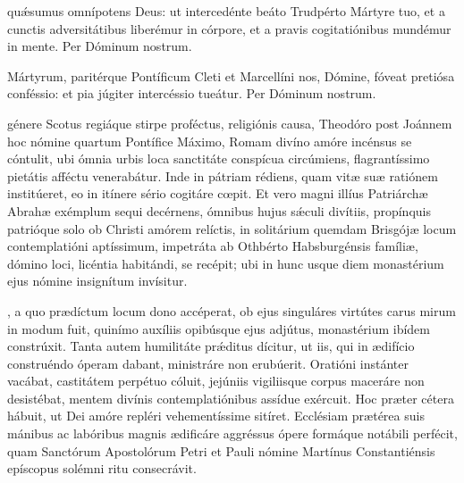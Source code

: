 \documentclass[fontsize=9pt,paper=A6,twoside,BCOR=1mm,DIV=22,headinclude]{scrarticle}
\begin{document}
\begin{multicols}{2}




\AiMTP

\VRMTPi 

 qu\'æsumus omnípotens Deus: ut intercedénte beáto Trudpérto Mártyre tuo, et a cunctis adversitátibus liberémur in córpore, et a pravis cogitatiónibus mundémur in mente. Per Dóminum nostrum.


\AiiMTP

\VRMTPii

 Mártyrum, paritérque Pontíficum Cleti et Marcellíni nos, Dómine, fóveat pretiósa conféssio: et pia júgiter intercéssio tueátur. Per Dóminum nostrum.

 génere Scotus regiáque stirpe proféctus, religiónis causa, Theodóro post Joánnem hoc nómine quartum Pontífice Máximo, Romam divíno amóre incénsus se cóntulit, ubi ómnia urbis loca sanctitáte conspícua circúmiens, flagrantíssimo pietátis afféctu venerabátur. Inde in pátriam rédiens, quam vitæ suæ ratiónem institúeret, eo in itínere sério cogitáre cœpit. Et vero magni illíus Patriárchæ Abrahæ exémplum sequi decérnens, ómnibus hujus s\'æculi divítiis, propínquis patrióque solo ob Christi amórem relíctis, in solitárium quemdam Brisgójæ locum contemplatióni aptíssimum, impetráta ab Othbérto Habsburgénsis famíliæ, dómino loci, licéntia habitándi, se recépit; ubi in hunc usque diem monastérium ejus nómine insignítum invísitur.

\RVMTPiv

, a quo prædíctum locum dono accéperat, ob ejus singuláres virtútes carus mirum in modum fuit, quinímo auxíliis opibúsque ejus adjútus, monastérium ibídem constrúxit. Tanta autem humilitáte pr\'æditus dícitur, ut iis, qui in ædifício construéndo óperam dabant, ministráre non erubúerit. Oratióni instánter vacábat, castitátem perpétuo cóluit, jejúniis vigiliisque corpus maceráre non desistébat, mentem divínis contemplatiónibus assídue exércuit. Hoc præter cétera hábuit, ut Dei amóre repléri vehementíssime sitíret. Ecclésiam prætérea suis mánibus ac labóribus magnis ædificáre aggréssus ópere formáque notábili perfécit, quam Sanctórum Apostolórum Petri et Pauli nómine Martínus Constantiénsis epíscopus solémni ritu consecrávit.


\end{multicols}
\end{document}
